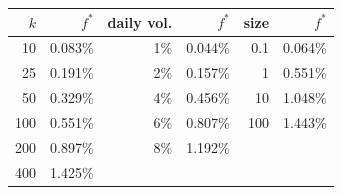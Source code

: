 \begin{tabular}{|r|r|r|r|r|r|}
\hline
\rowcolor{gray!15}$k$ & $f^*$ & daily vol. & $f^*$ & size & $f^*$ \\
\hline
10 & 0.083\% & 1\% & 0.044\% & 0.1 & 0.064\% \\
\hline
25 & 0.191\% & 2\% & 0.157\% & 1 & 0.551\% \\
\hline
50 & 0.329\% & 4\% & 0.456\% & 10 & 1.048\% \\
\hline
100 & 0.551\% & 6\% & 0.807\% & 100 & 1.443\% \\
\hline
200 & 0.897\% & 8\% & 1.192\% &  &  \\
\hline
400 & 1.425\% &  &  &  &  \\
\hline
\end{tabular}

